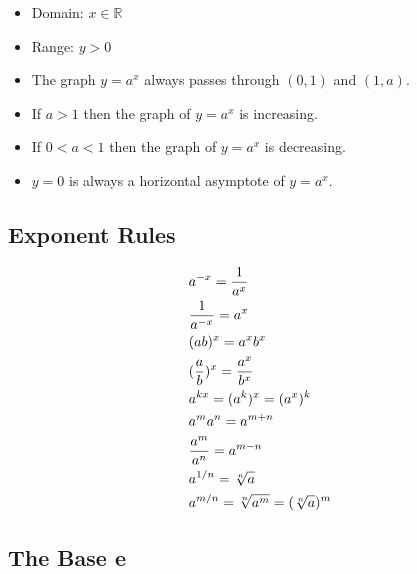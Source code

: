 \begin{itemize}
	\item
	      Domain: $ x \in \mathbb R $ \\

	\item
	      Range: $ y > 0 $ \\

	\item
	      The graph $ y = a^x $ always passes through $ (0, 1) $ and $ (1, a) $. \\

	\item
	      If $ a > 1$ then the graph of $ y = a^x $ is increasing. \\

	\item
	      If $ 0 < a < 1 $ then the graph of  $ y = a^x $ is decreasing. \\

	\item
	      $ y = 0 $ is always a horizontal asymptote of $ y = a^x $. \\
\end{itemize}

\subsection{Exponent Rules}

\begin{theorem}
	\begin{align}
		 & a^{-x} = {1 \over a^x}                    \\
		 & {1 \over a^{-x}} = a^x                    \\
		 & (ab)^x = a^xb^x                           \\
		 & ({a \over b})^x = {a^x \over b^x}         \\
		 & a^{kx} = (a^k)^x = (a^x)^k                \\
		 & a^ma^n = a^{m+n}                          \\
		 & {a^m \over a^n} = a^{m-n}                 \\
		 & a^{1/n} = \sqrt[n]{a}                     \\
		 & a^{m/n} = \sqrt[n]{a^m} = (\sqrt[n]{a})^m
	\end{align}
\end{theorem}

\subsection{The Base e}

